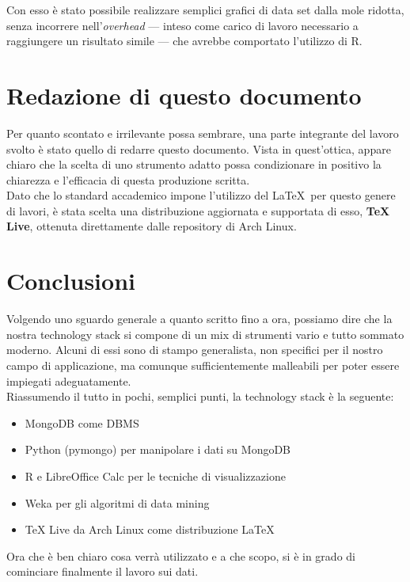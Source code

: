     Con esso è stato possibile realizzare semplici grafici di data set dalla mole ridotta, senza incorrere nell'\textit{overhead} --- inteso come carico di lavoro necessario a raggiungere un risultato simile --- che avrebbe comportato l'utilizzo di R.

\section{Redazione di questo documento}

    Per quanto scontato e irrilevante possa sembrare, una parte integrante del lavoro svolto è stato quello di redarre questo documento. Vista in quest'ottica, appare chiaro che la scelta di uno strumento adatto possa condizionare in positivo la chiarezza e l'efficacia di questa produzione scritta. \\

    Dato che lo standard accademico impone l'utilizzo del \LaTeX\ per questo genere di lavori, è stata scelta una distribuzione aggiornata e supportata di esso, \textbf{TeX Live}, ottenuta direttamente dalle repository di Arch Linux.

\section{Conclusioni}

    Volgendo uno sguardo generale a quanto scritto fino a ora, possiamo dire che la nostra technology stack si compone di un mix di strumenti vario e tutto sommato moderno. Alcuni di essi sono di stampo generalista, non specifici per il nostro campo di applicazione, ma comunque sufficientemente malleabili per poter essere impiegati adeguatamente. \\

    Riassumendo il tutto in pochi, semplici punti, la technology stack è la seguente:

    \begin{itemize}
        \item MongoDB come DBMS
        \item Python (pymongo) per manipolare i dati su MongoDB
        \item R e LibreOffice Calc per le tecniche di visualizzazione
        \item Weka per gli algoritmi di data mining
        \item TeX Live da Arch Linux come distribuzione \LaTeX
    \end{itemize}

    Ora che è ben chiaro cosa verrà utilizzato e a che scopo, si è in grado di cominciare finalmente il lavoro sui dati.
